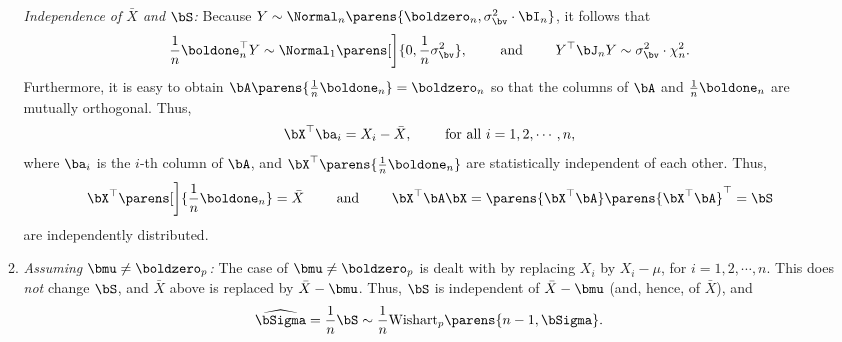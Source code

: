 \documentclass[12pt]{article}
\begin{document}
\begin{enumerate}[label=\textbf{\arabic*.}]
\begin{enumerate}
		\textit{Independence of $\bar{X}$ and $\bS$:} Because $Y \sim \Normal_n \parens{\boldzero_{n}, \sigma_{\bv}^2 \cdot \bI_n}$, it follows that 
		\begin{align*}
			\frac{1}{n} \boldone_n^\top Y \sim \Normal_1 \parens[\bigg]{0, \frac{1}{n} \sigma_{\bv}^2}, \qquad \text{ and } \qquad Y^\top \bJ_n Y \sim \sigma_{\bv}^2 \cdot \chi_{n}^2. 
		\end{align*}
		Furthermore, it is easy to obtain $\bA \parens{\frac{1}{n} \boldone_n} = \boldzero_{n}$ so that the columns of $\bA$ and $\frac{1}{n} \boldone_n$ are mutually orthogonal. Thus, 
		\begin{align*}
			\bX^\top \ba_i = X_i - \bar{X}, \qquad \text{ for all } i = 1, 2, \cdots, n, 
		\end{align*}
		where $\ba_i$ is the $i$-th column of $\bA$, and $\bX^\top \parens{\frac{1}{n} \boldone_n}$ are statistically independent of each other. Thus, 
		\begin{align*}
			\bX^\top \parens[\bigg]{\frac{1}{n} \boldone_n} = \bar{X} \qquad \text{ and } \qquad \bX^\top \bA \bX = \parens{\bX^\top \bA} \parens{\bX^\top \bA}^\top = \bS
		\end{align*}
		are independently distributed. 

		
		\item \textit{Assuming $\bmu \neq \boldzero_p$:} The case of $\bmu \neq \boldzero_p$ is dealt with by replacing $X_i$ by $X_i - \mu$, for $i = 1, 2, \cdots, n$. This does \emph{not} change $\bS$, and $\bar{X}$ above is replaced by $\bar{X} - \bmu$. Thus, $\bS$ is independent of $\bar{X} - \bmu$ (and, hence, of $\bar{X}$), and
		\begin{align}
			\widehat{\bSigma} = \frac{1}{n} \bS \sim \frac{1}{n} \mathrm{Wishart}_p \parens{n-1, \bSigma}. 
		\end{align}
	\end{enumerate}

\end{enumerate}

\printbibliography
\end{document}
